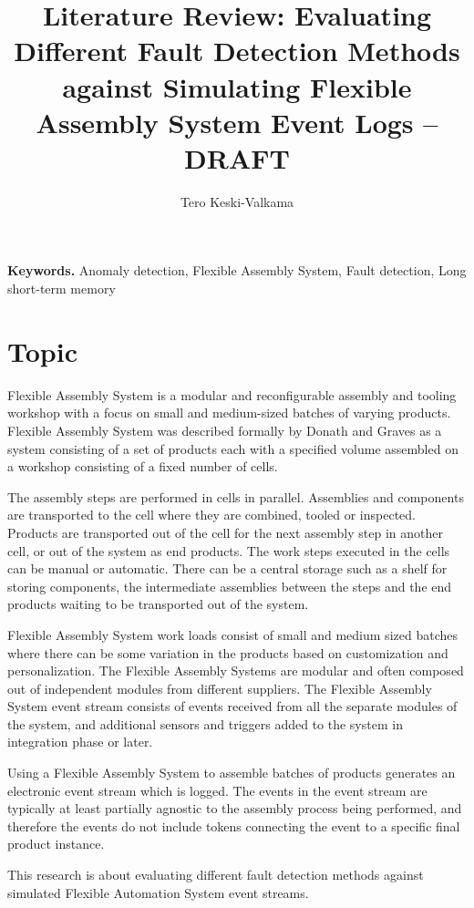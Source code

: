 \documentclass[a4paper,10pt]{article}
\title{Literature Review: Evaluating Different Fault Detection Methods against Simulating Flexible Assembly System Event Logs – DRAFT}
\author{Tero Keski-Valkama}
\begin{document}
\maketitle

\smallskip
\noindent \textbf{Keywords.} Anomaly detection, Flexible Assembly System, Fault detection, Long short-term memory

\section{Topic}
Flexible Assembly System is a modular and reconfigurable assembly and tooling workshop with a focus on small and medium-sized batches of varying products.
Flexible Assembly System was described formally by Donath and Graves \cite{donath1988flexible} as a system consisting of a set of products each with a specified volume
assembled on a workshop consisting of a fixed number of cells.

The assembly steps are performed in cells in parallel. Assemblies and components are transported to the cell where they are combined, tooled or inspected. Products
are transported out of the cell for the next assembly step in another cell, or out of the system as end products.
The work steps executed in the cells can be manual or automatic. There can be a central storage such as a shelf for storing components, the intermediate assemblies between the steps
and the end products waiting to be transported out of the system.

Flexible Assembly System work loads consist of small and medium sized batches where there can be some variation in the products based on customization and personalization.
The Flexible Assembly Systems are modular and often composed out of independent modules from different suppliers. The Flexible Assembly System event stream consists
of events received from all the separate modules of the system, and additional sensors and triggers added to the system in integration phase or later.

Using a Flexible Assembly System to assemble batches of products generates an electronic event stream which is logged. The events in the event stream are typically at least
partially agnostic to the assembly process being performed, and therefore the events do not include tokens connecting the event to a specific final product instance.

This research is about evaluating different fault detection methods against simulated Flexible Automation System event streams.
\end{document}
